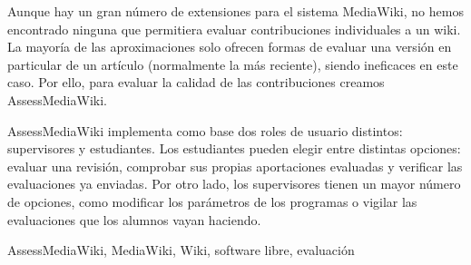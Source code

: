 Aunque hay un gran número de extensiones para el sistema MediaWiki, no hemos encontrado ninguna que permitiera evaluar contribuciones individuales a un wiki. La mayoría de las aproximaciones solo ofrecen formas de evaluar una versión en particular de un artículo (normalmente la más reciente), siendo ineficaces en este caso. Por ello, para evaluar la calidad de las contribuciones creamos AssessMediaWiki.
\newline

AssessMediaWiki implementa como base dos roles de usuario distintos: supervisores y estudiantes. Los estudiantes pueden elegir entre distintas opciones: evaluar una revisión, comprobar sus propias aportaciones evaluadas y verificar las evaluaciones ya enviadas. Por otro lado, los supervisores tienen un mayor número de opciones, como modificar los parámetros de los programas o vigilar las evaluaciones que los alumnos vayan haciendo.
\newline

 AssessMediaWiki, MediaWiki, Wiki, software libre, evaluación
